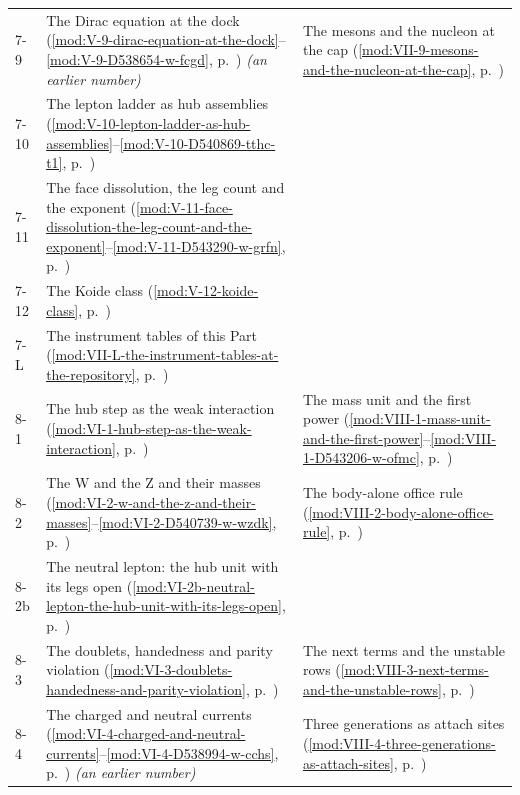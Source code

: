 {\begin{longtable}{p{11mm}p{70mm}p{60mm}}
7-9 & The Dirac equation at the dock (\ref{mod:V-9-dirac-equation-at-the-dock}--\ref{mod:V-9-D538654-w-fcgd}, p.~\pageref{mod:V-9-dirac-equation-at-the-dock}) \emph{(an earlier number)} & The mesons and the nucleon at the cap (\ref{mod:VII-9-mesons-and-the-nucleon-at-the-cap}, p.~\pageref{mod:VII-9-mesons-and-the-nucleon-at-the-cap}) \\
7-10 & The lepton ladder as hub assemblies (\ref{mod:V-10-lepton-ladder-as-hub-assemblies}--\ref{mod:V-10-D540869-tthc-t1}, p.~\pageref{mod:V-10-lepton-ladder-as-hub-assemblies}) &  \\
7-11 & The face dissolution, the leg count and the exponent (\ref{mod:V-11-face-dissolution-the-leg-count-and-the-exponent}--\ref{mod:V-11-D543290-w-grfn}, p.~\pageref{mod:V-11-face-dissolution-the-leg-count-and-the-exponent}) &  \\
7-12 & The Koide class (\ref{mod:V-12-koide-class}, p.~\pageref{mod:V-12-koide-class}) &  \\
7-L & The instrument tables of this Part (\ref{mod:VII-L-the-instrument-tables-at-the-repository}, p.~\pageref{mod:VII-L-the-instrument-tables-at-the-repository}) &  \\
8-1 & The hub step as the weak interaction (\ref{mod:VI-1-hub-step-as-the-weak-interaction}, p.~\pageref{mod:VI-1-hub-step-as-the-weak-interaction}) & The mass unit and the first power (\ref{mod:VIII-1-mass-unit-and-the-first-power}--\ref{mod:VIII-1-D543206-w-ofmc}, p.~\pageref{mod:VIII-1-mass-unit-and-the-first-power}) \\
8-2 & The W and the Z and their masses (\ref{mod:VI-2-w-and-the-z-and-their-masses}--\ref{mod:VI-2-D540739-w-wzdk}, p.~\pageref{mod:VI-2-w-and-the-z-and-their-masses}) & The body-alone office rule (\ref{mod:VIII-2-body-alone-office-rule}, p.~\pageref{mod:VIII-2-body-alone-office-rule}) \\
8-2b & The neutral lepton: the hub unit with its legs open (\ref{mod:VI-2b-neutral-lepton-the-hub-unit-with-its-legs-open}, p.~\pageref{mod:VI-2b-neutral-lepton-the-hub-unit-with-its-legs-open}) &  \\
8-3 & The doublets, handedness and parity violation (\ref{mod:VI-3-doublets-handedness-and-parity-violation}, p.~\pageref{mod:VI-3-doublets-handedness-and-parity-violation}) & The next terms and the unstable rows (\ref{mod:VIII-3-next-terms-and-the-unstable-rows}, p.~\pageref{mod:VIII-3-next-terms-and-the-unstable-rows}) \\
8-4 & The charged and neutral currents (\ref{mod:VI-4-charged-and-neutral-currents}--\ref{mod:VI-4-D538994-w-cchs}, p.~\pageref{mod:VI-4-charged-and-neutral-currents}) \emph{(an earlier number)} & Three generations as attach sites (\ref{mod:VIII-4-three-generations-as-attach-sites}, p.~\pageref{mod:VIII-4-three-generations-as-attach-sites}) \\

\end{longtable}}
